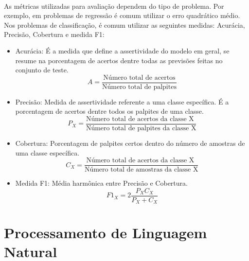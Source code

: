 \documentclass[grad,numbers]{coppe}
\begin{document}
				\paragraph{}As métricas utilizadas para avaliação dependem do tipo de problema. Por exemplo, em problemas de regressão é comum utilizar o erro quadrático médio\cite{regression-loss}. Nos problemas de classificação, é comum utilizar as seguintes medidas: Acurácia, Precisão, Cobertura e medida F1:
				\begin{itemize}
					\item Acurácia: É a medida que define a assertividade do modelo em geral, se resume na porcentagem de acertos dentre todas as previsões feitas no conjunto de teste.
					\begin{equation*}
						A = \frac{\text{Número total de acertos}}{\text{Número total de palpites}}
					\end{equation*}
					\item Precisão: Medida de assertividade referente a uma classe específica. É a porcentagem de acertos dentre todos os palpites de uma classe.
					\begin{equation*}
						P_X = \frac{\text{Número total de acertos da classe X }}{\text{Número total de palpites da classe X}}
					\end{equation*}
					\item Cobertura: Porcentagem de palpites certos dentro do número de amostras de uma classe específica.
					\begin{equation*}
						C_X = \frac{\text{Número total de acertos da classe X }}{\text{Número total de amostras da classe X}}
					\end{equation*}
					\item  Medida F1: Média harmônica entre Precisão e Cobertura.
						\begin{equation*}
						F1_X = 2\frac{P_X C_X}{P_X + C_X}
						\end{equation*}
				\end{itemize}
  
  \section{Processamento de Linguagem Natural}
\end{document}
